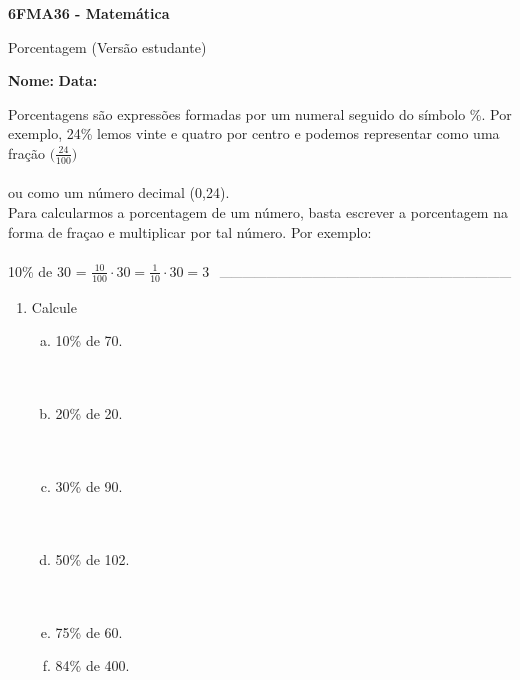 \documentclass[a4paper,14pt]{article}
\begin{document}
	
	\noindent\textbf{6FMA36 - Matemática} 
	
	\begin{center}Porcentagem (Versão estudante)
	\end{center}
	
	\noindent\textbf{Nome:} \underline{\hspace{10cm}}
	\noindent\textbf{Data:} \underline{\hspace{4cm}}
	
    \begin{multicols}{2}
    	\noindent Porcentagens são expressões formadas por um numeral seguido do símbolo \%. Por exemplo, 24\% lemos vinte e quatro por centro e podemos representar como uma fração $\bigg(\frac{24}{100}\bigg)$\\\\ ou como um número decimal (0,24). \\
    	Para calcularmos a porcentagem de um número, basta escrever a porcentagem na forma de fraçao e multiplicar por tal número. Por exemplo: \\\\
    	10\% de 30 = $\frac{10}{100} \cdot 30 = \frac{1}{10} \cdot 30 = 3$
    	\noindent\textsubscript{~---------------------------------------------------------------------------}
    	\begin{enumerate}
			\item Calcule
			\begin{enumerate}[a)]
				\item 10\% de 70. \\\\\\
				\item 20\% de 20. \\\\\\
				\item 30\% de 90. \\\\\\
				\item 50\% de 102. \\\\\\
				\item 75\% de 60. \\
				\item 84\% de 400. \\\\\\

\end{enumerate}
\end{enumerate}
\end{multicols}
\end{document}
